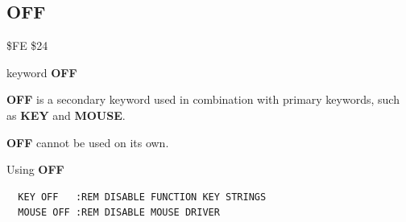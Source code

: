 
\newpage
\subsection{OFF}
\begin{description}[leftmargin=2cm,style=nextline]
\item [Token:] \$FE \$24
\item [Format:] keyword {\bf OFF}
\item [Usage:]  {\bf OFF} is a secondary keyword used in
                combination with primary keywords, such as
                {\bf KEY} and  {\bf MOUSE}.

\item [Remarks:] {\bf OFF} cannot be used on its own.

\item [Examples:] Using {\bf OFF}

\begin{tcolorbox}[colback=black,coltext=white]
\verbatimfont{\codefont}
\begin{verbatim}
  KEY OFF   :REM DISABLE FUNCTION KEY STRINGS
  MOUSE OFF :REM DISABLE MOUSE DRIVER
\end{verbatim}
\end{tcolorbox}
\end{description}


\newpage

